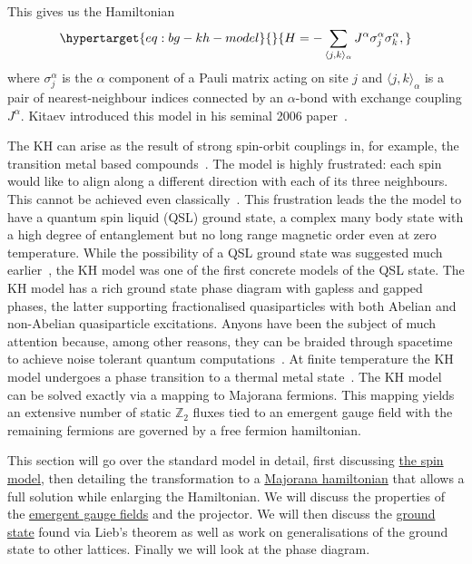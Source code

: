 This gives us the Hamiltonian \begin{equation}\protect\hypertarget{eq:bg-kh-model}{}{ H =  - \sum_{\langle j,k\rangle_\alpha} J^{\alpha}\sigma_j^{\alpha}\sigma_k^{\alpha}, }\label{eq:bg-kh-model}\end{equation} where \(\sigma^\alpha_j\) is the \(\alpha\) component of a Pauli matrix acting on site \(j\) and \(\langle j,k\rangle_\alpha\) is a pair of nearest-neighbour indices connected by an \(\alpha\)-bond with exchange coupling \(J^\alpha\). Kitaev introduced this model in his seminal 2006 paper~\autocite{kitaevAnyonsExactlySolved2006}.

The KH can arise as the result of strong spin-orbit couplings in, for example, the transition metal based compounds~\autocite{Jackeli2009,HerrmannsAnRev2018,Winter2017,TrebstPhysRep2022,Takagi2019}. The model is highly frustrated: each spin would like to align along a different direction with each of its three neighbours. This cannot be achieved even classically~\autocite{chandraClassicalHeisenbergSpins2010,selaOrderbydisorderSpinorbitalLiquids2014}. This frustration leads the the model to have a quantum spin liquid (QSL) ground state, a complex many body state with a high degree of entanglement but no long range magnetic order even at zero temperature. While the possibility of a QSL ground state was suggested much earlier~\autocite{andersonResonatingValenceBonds1973}, the KH model was one of the first concrete models of the QSL state. The KH model has a rich ground state phase diagram with gapless and gapped phases, the latter supporting fractionalised quasiparticles with both Abelian and non-Abelian quasiparticle excitations. Anyons have been the subject of much attention because, among other reasons, they can be braided through spacetime to achieve noise tolerant quantum computations~\autocite{freedmanTopologicalQuantumComputation2003}. At finite temperature the KH model undergoes a phase transition to a thermal metal state~\autocite{selfThermallyInducedMetallic2019}. The KH model can be solved exactly via a mapping to Majorana fermions. This mapping yields an extensive number of static \(\mathbb Z_2\) fluxes tied to an emergent gauge field with the remaining fermions are governed by a free fermion hamiltonian.

This section will go over the standard model in detail, first discussing \protect\hyperlink{the-spin-model}{the spin model}, then detailing the transformation to a \protect\hyperlink{the-majorana-model}{Majorana hamiltonian} that allows a full solution while enlarging the Hamiltonian. We will discuss the properties of the \protect\hyperlink{emergent-gauge-fields}{emergent gauge fields} and the projector. We will then discuss the \protect\hyperlink{bg-the-ground-state}{ground state} found via Lieb's theorem as well as work on generalisations of the ground state to other lattices. Finally we will look at the phase diagram.

